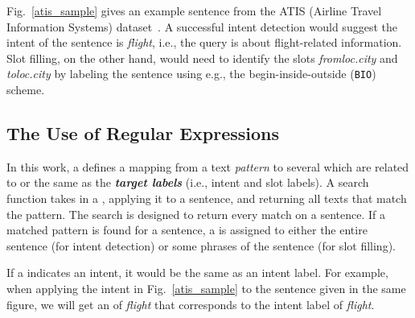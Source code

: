 
 Fig.~\ref{atis_sample} gives an example sentence from the ATIS (Airline Travel Information Systems)
dataset~\cite{hemphill1990atis}. A successful intent detection would suggest the intent of the sentence is \emph{flight}, i.e., the query
is about flight-related information. Slot filling, on the other hand, would need to identify the slots \emph{fromloc.city} and
\emph{toloc.city} by labeling the sentence using e.g., the begin-inside-outside (\texttt{BIO}) scheme.




\subsection{The Use of Regular Expressions}
\label{re_desc}

In this work, a \RE defines a mapping from a text \emph{pattern} to several \textbf{\emph{\REtags}} which are related to or the same as the
\textbf{\emph{target labels}} (i.e., intent and slot labels). A search function takes in a \RE, applying it to a sentence, and returning
all texts that match the pattern. The search is designed to return every match on a sentence. If a matched pattern is found for a sentence,
a \REtag is assigned to either the entire sentence (for intent detection) or some phrases of the sentence (for slot filling).



If a \REtag indicates an intent, it would be the same as an intent label. For example, when applying the intent \RE in
Fig.~\ref{atis_sample} to the sentence given in the same figure, we will get an \REtag of \emph{flight} that corresponds to the intent
label of \emph{flight}.



